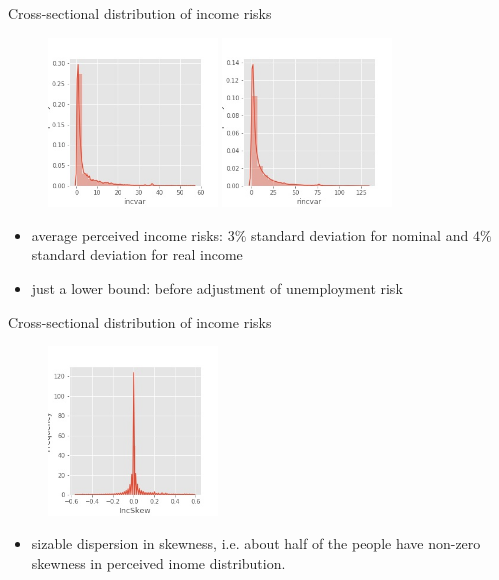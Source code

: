 \documentclass{beamer}
\begin{document}
\begin{frame}{Cross-sectional distribution of income risks}
	\begin{figure}
		\centering
		\label{incvar_hist}
		\includegraphics[width=0.4\textwidth]{figures/hist_incvar}
		\includegraphics[width=0.4\textwidth]{figures/hist_rincvar}
	\end{figure}
	\begin{itemize}
		\item average perceived income risks:  $3\%$ standard deviation for nominal and $4\%$ standard deviation for real income
		\item just a lower bound: before adjustment of unemployment risk 
	\end{itemize}
\end{frame}

\begin{frame}{Cross-sectional distribution of income risks}
	\begin{figure}
		\centering
		\label{incvar_skew}
		\includegraphics[width=0.4\textwidth]{figures/histIncSkew}
	\end{figure}
	\begin{itemize}
		\item sizable dispersion in skewness, i.e. about half of the people have non-zero skewness in perceived inome distribution. 
	\end{itemize}
\end{frame}
\end{document}
